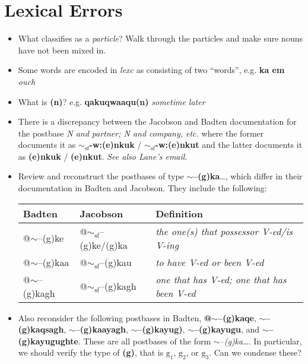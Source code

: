 \documentclass{article}
\begin{document}
\pagebreak

\section{Lexical Errors}
\begin{itemize}
\item What classifies as a \textit{particle}? Walk through the particles and make sure nouns have not been mixed in.

\item Some words are encoded in \textit{lexc} as consisting of two ``words'', e.g. \textbf{ka em} \textit{ouch} 

\item What is \textbf{(n)}? e.g. \textbf{qakuqwaaqu(n)} \textit{sometime later}

\item There is a discrepancy between the Jacobson and Badten documentation for the postbase \textit{N and partner; N and company, etc.} where the former documents it as \textbf{$\sim_\text{sf}$-w:(e)nkuk} / \textbf{$\sim_\text{sf}$-w:(e)nkut} and the latter documents it as \textbf{(e)nkuk} / \textbf{(e)nkut}. \textit{See also Lane's email}.

\item Review and reconstruct the postbases of type \textbf{$\sim$--(g)ka}\ldots, which differ in their documentation in Badten and Jacobson. They include the following:

\begin{tabular}{l l l}
\textbf{Badten} & \textbf{Jacobson} & \textbf{Definition} \\
\hline \hline
@$\sim$--(g)ke & @$\sim_\text{sf}$--(g)ke/(g)ka & \textit{the one(s) that possessor V-ed/is V-ing} \\
@$\sim$--(g)kaa & @$\sim_\text{sf}$--(g)kau & \textit{to have V-ed or been V-ed} \\
@$\sim$--(g)kagh & @$\sim_\text{sf}$--(g)kagh & \textit{one that has V-ed; one that has been V-ed}
\end{tabular}

\item[] Also reconsider the following postbases in Badten, \textbf{@$\sim$--(g)kaqe}, \textbf{$\sim$--(g)kaqsagh}, \textbf{$\sim$--(g)kaayagh}, \textbf{$\sim$--(g)kayug)}, \textbf{$\sim$--(g)kayugu}, and \textbf{$\sim$--(g)kayugughte}. These are all postbases of the form \textit{$\sim$--(g)ka\ldots}. In particular, we should verify the type of \textbf{(g)}, that is \textbf{$\text{g}_1$}, \textbf{$\text{g}_2$}, or \textbf{$\text{g}_3$}. Can we condense these?


\end{itemize}
\end{document}
